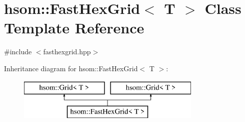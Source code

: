\hypertarget{classhsom_1_1_fast_hex_grid}{\section{hsom\-:\-:\-Fast\-Hex\-Grid$<$ \-T $>$ \-Class \-Template \-Reference}
\label{classhsom_1_1_fast_hex_grid}
}


{\ttfamily \#include $<$fasthexgrid.\-hpp$>$}

\-Inheritance diagram for hsom\-:\-:\-Fast\-Hex\-Grid$<$ \-T $>$\-:\begin{figure}[H]
\begin{center}
\leavevmode
\includegraphics[height=2.000000cm]{classhsom_1_1_fast_hex_grid}
\end{center}
\end{figure}
